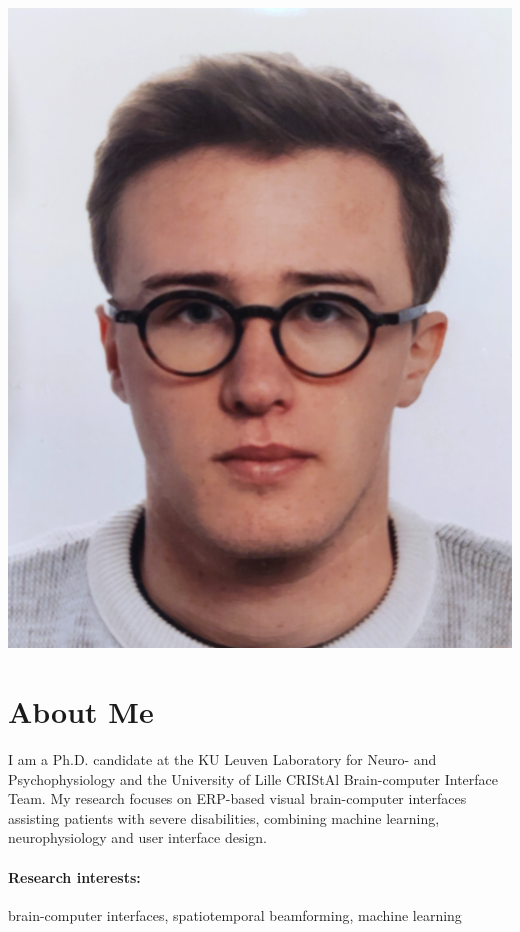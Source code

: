 \documentclass[10pt,a4paper]{article}
\begin{document}
    \begin{minipage}{.25\linewidth}
        \includegraphics[width=\linewidth]{photo.jpg}
    \end{minipage}


    \section*{About Me}

    I am a Ph.D. candidate at the KU Leuven Laboratory for Neuro- and Psychophysiology and the University of Lille
    CRIStAl Brain-computer Interface Team.
    My research focuses on ERP-based visual brain-computer interfaces assisting patients with severe disabilities,
    combining machine learning, neurophysiology and user interface design.

    \paragraph{Research interests:} brain-computer interfaces, spatiotemporal beamforming, machine learning
\end{document}
